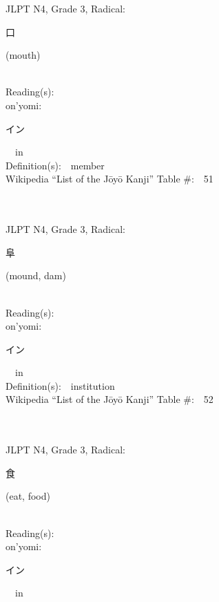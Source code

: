 \begin{multicols}{2}
{JLPT N4, Grade 3, Radical:\ \ {\begin{CJK}{UTF8}{min} 口 \end{CJK}} (mouth) } \\
Reading(s):\ \ \\
{\hspace*{1em}}on'yomi:\ \ \\
{\hspace*{2em}}{\begin{CJK}{UTF8}{min} イン \end{CJK}}\ \ in\ \ \\
Definition(s):\ \ member \\
Wikipedia ``List of the J\=oy\=o Kanji'' Table \#:\ \ 51 \\
\ \ \\
{\fontsize{34pt}{40pt}  }\ \ \\  %
{JLPT N4, Grade 3, Radical:\ \ {\begin{CJK}{UTF8}{min} 阜 \end{CJK}} (mound, dam) } \\
Reading(s):\ \ \\
{\hspace*{1em}}on'yomi:\ \ \\
{\hspace*{2em}}{\begin{CJK}{UTF8}{min} イン \end{CJK}}\ \ in\ \ \\
Definition(s):\ \ institution \\
Wikipedia ``List of the J\=oy\=o Kanji'' Table \#:\ \ 52 \\
\ \ \\
{\fontsize{34pt}{40pt}  }\ \ \\  %
{JLPT N4, Grade 3, Radical:\ \ {\begin{CJK}{UTF8}{min} 食 \end{CJK}} (eat, food) } \\
Reading(s):\ \ \\
{\hspace*{1em}}on'yomi:\ \ \\
{\hspace*{2em}}{\begin{CJK}{UTF8}{min} イン \end{CJK}}\ \ in\ \ \\

\end{multicols}

